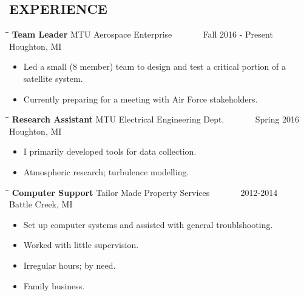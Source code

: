 \documentclass[letterpaper]{res}
\begin{document}
\begin{resume}
  \section{EXPERIENCE}
  \vspace{-0.15in}
  \begin{tabbing}
    \hspace{2.3in}\= \hspace{2.6in}\= \kill %
    {\bf Team Leader} \>MTU Aerospace Enterprise \> ~~~~~~ Fall 2016 - Present\\
    \>Houghton, MI
  \end{tabbing}\vspace{-10pt}
  \begin{itemize} \itemsep1pt \parskip0pt 
    \item Led a small (8 member) team to design and test a critical portion of a satellite system.
    \item Currently preparing for a meeting with Air Force stakeholders.
  \end{itemize}

  \vspace{-0.15in}
  \begin{tabbing}
    \hspace{2.3in}\= \hspace{2.6in}\= \kill %
    {\bf Research Assistant} \>MTU Electrical Engineering Dept. \> ~~~~~~ Spring 2016\\
    \>Houghton, MI
  \end{tabbing}\vspace{-10pt}
  \begin{itemize} \itemsep1pt \parskip0pt 
    \item I primarily developed tools for data collection.
    \item Atmospheric research; turbulence modelling.
  \end{itemize}

  \vspace{-0.15in}
  \begin{tabbing}
    \hspace{2.3in}\= \hspace{2.6in}\= \kill %
    {\bf Computer Support} \>Tailor Made Property Services \> ~~~~~~ 2012-2014\\
    \>Battle Creek, MI
  \end{tabbing}\vspace{-10pt}
  \begin{itemize} \itemsep1pt \parskip0pt 
    \item Set up computer systems and assisted with general troublshooting.
    \item Worked with little supervision.
    \item Irregular hours; by need.
    \item Family business.
  \end{itemize}


\end{resume}
\end{document}
